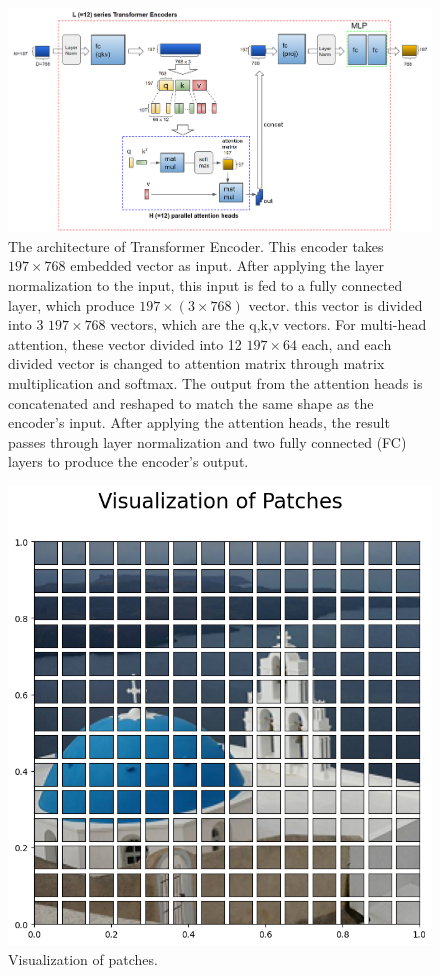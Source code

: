 \documentclass[extendedabs]{bmvc2k}
\begin{document}
\begin{figure}[t]
\centering
	\includegraphics[width=\linewidth]{images/fig3.png}
	\caption{
		The architecture of Transformer Encoder. This encoder takes $197\times768$ embedded vector as input. After applying the layer normalization to the input, this input is fed to a fully connected layer, which produce $197\times(3\times768)$ vector. this vector is divided into 3 $197\times768$ vectors, which are the q,k,v vectors. For multi-head attention, these vector divided into 12 $197\times64$ each, and each divided vector is changed to attention matrix through matrix multiplication and softmax. The output from the attention heads is concatenated and reshaped to match the same shape as the encoder's input. After applying the attention heads, the result passes through layer normalization and two fully connected (FC) layers to produce the encoder's output.}
	\vspace{-2mm}
    \label{encoderarch}
\end{figure}


\begin{figure}[t]
\centering
\centering
	\includegraphics[width=0.5\linewidth]{images/fig4.png}
	\caption{
		Visualization of patches.}
	\vspace{-2mm}
    
\end{figure}
\end{document}
